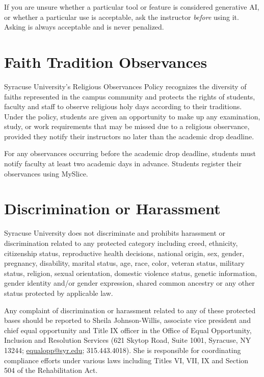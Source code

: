 \documentclass[11pt]{article}
\begin{document}
If you are unsure whether a particular tool or feature is considered generative AI, or whether
a particular use is acceptable, ask the instructor \emph{before} using it. Asking is always
acceptable and is never penalized.

\section{Faith Tradition Observances}

Syracuse University's Religious Observances Policy recognizes the diversity of faiths
represented in the campus community and protects the rights of students, faculty and staff to
observe religious holy days according to their traditions. Under the policy, students are given
an opportunity to make up any examination, study, or work requirements that may be missed due
to a religious observance, provided they notify their instructors no later than the academic
drop deadline.

For any observances occurring before the academic drop deadline, students must notify faculty
at least two academic days in advance. Students register their observances using MySlice.

\section{Discrimination or Harassment}

Syracuse University does not discriminate and prohibits harassment or discrimination related
to any protected category including creed, ethnicity, citizenship status, reproductive health
decisions, national origin, sex, gender, pregnancy, disability, marital status, age, race,
color, veteran status, military status, religion, sexual orientation, domestic violence
status, genetic information, gender identity and/or gender expression, shared common ancestry
or any other status protected by applicable law.

Any complaint of discrimination or harassment related to any of these protected bases should
be reported to Sheila Johnson-Willis, associate vice president and chief equal opportunity and
Title IX officer in the Office of Equal Opportunity, Inclusion and Resolution Services (621
Skytop Road, Suite 1001, Syracuse, NY 13244;
\href{mailto:equalopp@syr.edu}{equalopp@syr.edu}; 315.443.4018). She is responsible for
coordinating compliance efforts under various laws including Titles VI, VII, IX and Section
504 of the Rehabilitation Act.
\end{document}
